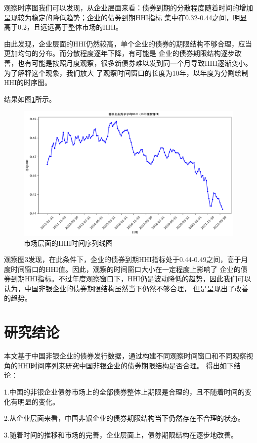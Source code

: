 \documentclass[a4paper,12pt]{report}
\begin{document}
    观察时序图我们可以发现，从企业层面来看：债券到期的分散程度随着时间的增加呈现较为稳定的降低趋势；企业的债券到期HHI指标
    集中在0.32-0.44之间，明显高于0.2，且远远高于整体市场的HHI。

    由此发现，企业层面的HHI仍然较高，单个企业的债券的期限结构不够合理，应当更加均匀的分布。而分散程度逐年下降，有可能是
    企业的债券期限结构逐步改善，也有可能是按照月度观察，很多新债券难以发到同一个月导致HHI逐渐变小。为了解释这个现象，我们放大
    了观察时间窗口的长度为10年，以年度为分割绘制HHI的时序图。

    结果如图\ref{fig:output4}所示。
    \begin{figure}[htbp]
        \centering
        \includegraphics[scale=0.6]{figure/output4}
        \caption{市场层面的HHI时间序列线图}
        \label{fig:output4}
    \end{figure}

    观察图3发现，在此条件下，企业的债券到期HHI指标处于0.44-0.49之间，高于月度时间窗口的HHI值。因此，观察的时间窗口大小在一定程度上影响了
    企业的债券到期HHI指标。不过年度观察窗口下，HHI仍是波动降低的趋势，因此我们可以认为，中国非银企业的债券期限结构虽然当下仍然不够合理，
    但是呈现出了改善的趋势。
    

    \chapter{研究结论}
    本文基于中国非银企业的债券发行数据，通过构建不同观察时间窗口和不同观察视角的HHI时间序列来研究中国非银企业的债券期限结构是否合理。
    得出如下结论：

    1.中国的非银企业债券市场上的全部债券整体上期限是合理的，且不随着时间的变化有明显的变化。

    2.从企业层面来看，中国非银企业的债券期限结构当下仍然存在不合理的状态。

    3.随着时间的推移和市场的完善，企业层面上，债券期限结构在逐步地改善。

    \nocite{*}
    {\color{black} \printbibliography}
\end{document}
